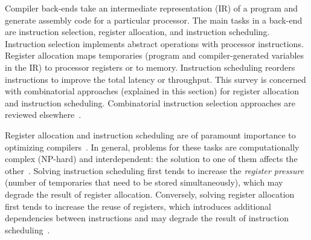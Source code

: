 \documentclass[acmsmall,authorversion,nonacm]{acmart}
\begin{document}
Compiler back-ends take an intermediate representation (IR) of a
program and generate assembly code for a particular processor.
The main tasks in a back-end are instruction selection, register
allocation, and instruction scheduling.
Instruction selection implements abstract operations with processor
instructions.
Register allocation maps temporaries (program and compiler-generated
variables in the IR) to processor registers or to memory.
Instruction scheduling reorders instructions to improve the total
latency or throughput.
This survey is concerned with combinatorial approaches (explained in
this section) for register allocation and instruction scheduling.
Combinatorial instruction selection approaches are reviewed
elsewhere~\cite{HjortBlindell2016}.

Register allocation and instruction scheduling are of paramount
importance to optimizing
compilers~\cite{Fisher1983,Nandivada2007,Hennessy2011}.
In general, problems for these tasks are computationally complex
(NP-hard) and interdependent: the solution to one of them affects the
other~\cite{Goodman1988}.
Solving instruction scheduling first tends to increase the
\emph{register pressure} (number of temporaries that need to be stored
simultaneously), which may degrade the result of register allocation.
Conversely, solving register allocation first tends to increase the
reuse of registers, which introduces additional dependencies between
instructions and may degrade the result of instruction
scheduling~\cite{Govindarajan2007}.
\end{document}
